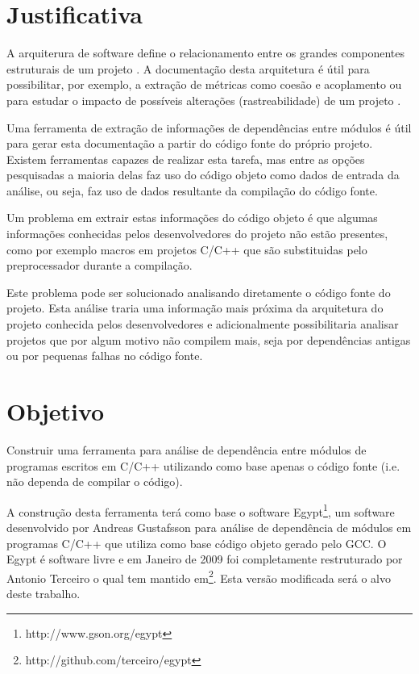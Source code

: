 \chapter{Justificativa}

A arquiterura de software define o relacionamento entre os grandes componentes
estruturais de um projeto \cite{engenhariaDeSoftwarePressman}. A documentação
desta arquitetura é útil para possibilitar, por exemplo, a extração de métricas
como coesão e acoplamento ou para estudar o impacto de possíveis alterações
(rastreabilidade) de um projeto \cite{mata26-terceiro-projeto-piloto}.

Uma ferramenta de extração de informações de dependências entre módulos é útil
para gerar esta documentação a partir do código fonte do próprio projeto.
Existem ferramentas capazes de realizar esta tarefa, mas entre as opções
pesquisadas \cite{sourceVersusObjectCodeExtraction} a maioria delas faz uso do
código objeto como dados de entrada da análise, ou seja, faz uso de dados
resultante da compilação do código fonte.

Um problema em extrair estas informações do código objeto é que algumas
informações conhecidas pelos desenvolvedores do projeto não estão presentes,
como por exemplo macros em projetos C/C++ que são substituidas pelo
preprocessador \cite{sourceVersusObjectCodeExtraction} durante a compilação.

Este problema pode ser solucionado analisando diretamente o código fonte do
projeto. Esta análise traria uma informação mais próxima da arquitetura do
projeto conhecida pelos desenvolvedores e adicionalmente possibilitaria
analisar projetos que por algum motivo não compilem mais, seja por dependências
antigas ou por pequenas falhas no código fonte.

\chapter{Objetivo}

Construir uma ferramenta para análise de dependência entre módulos de programas
escritos em C/C++ utilizando como base apenas o código fonte (i.e.  não dependa
de compilar o código).

A construção desta ferramenta terá como base o software
Egypt\footnote{http://www.gson.org/egypt}, um software desenvolvido por Andreas
Gustafsson para análise de dependência de módulos em programas C/C++ que
utiliza como base código objeto gerado pelo GCC. O Egypt é software livre e em
Janeiro de 2009 foi completamente restruturado por Antonio Terceiro o qual tem
mantido em\footnote{http://github.com/terceiro/egypt}. Esta versão modificada
será o alvo deste trabalho.

